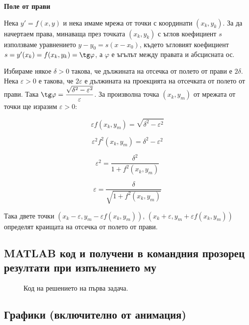 \documentclass[14pt]{extarticle}
\let\frac\dfrac
\let\epsilon\varepsilon
\begin{document}
\textbf{Поле от прави}

Нека $y' = f(x, y)$ и нека имаме мрежа от точки с координати $(x_k, y_k)$. За да начертаем права, минаваща през точката $(x_k, y_k)$ с ъглов коефициент $s$ използваме уравнението $y-y_0 = s(x - x_0)$, където ъгловият коефициент $s = y'(x_k) = f(x_k, y_k) = \tg\varphi$, а $\varphi$ е ъгълът между правата и абсцисната ос.

Избираме някое $\delta > 0$ такова, че дължината на отсечка от полето от прави е $2\delta$. Нека $\epsilon > 0$ е такова, че $2\epsilon$ е дължината на проекцията на отсечката от полето от прави. Така $\tg\varphi = \frac{\sqrt{\delta^2 - \epsilon^2}}{\epsilon}$. За произволна точка $(x_k, y_m)$ от мрежата от точки ще изразим $\epsilon > 0$:

\[ \epsilon f(x_k, y_m) = \sqrt{\delta^2 - \epsilon^2} \]

\[ \epsilon^2f^2(x_k, y_m) = \delta^2 - \epsilon^2 \]

\[ \epsilon^2 = \frac{\delta^2}{1 + f^2(x_k, y_m)} \]

\[ \epsilon = \frac{\delta}{\sqrt{1 + f^2(x_k, y_m)}} \]

Така двете точки $(x_k-\epsilon, y_m - \epsilon f(x_k, y_m)) , \, (x_k+\epsilon, y_m + \epsilon f(x_k, y_m))$ определят краищата на отсечка от полето от прави.

\subsection{MATLAB  код и получени в командния прозорец резултати при изпълнението му}

\begin{figure}[H]
	\begin{quote}
	
	\end{quote}
	\caption{Код на решението на първа задача.}
\end{figure}

\subsection{Графики (включително от анимация)}
\end{document}
